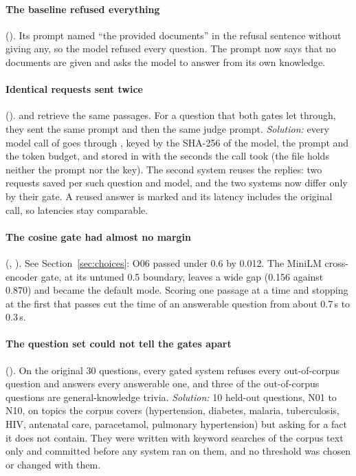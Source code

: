 \paragraph{The  baseline refused everything} ().
Its prompt named ``the provided documents'' in the refusal sentence without giving any, so the model
refused every question. The prompt now says that no documents are given and asks the model to
answer from its own knowledge.

\paragraph{Identical requests sent twice} ().
 and  retrieve the same passages. For a question that both gates
let through, they sent the same prompt and then the same judge prompt. \emph{Solution:} every model
call of  goes through , keyed by the SHA-256 of the model, the prompt and
the token budget, and stored in  with the seconds the call took (the
file holds neither the prompt nor the key). The second system reuses the replies: two requests saved
per such question and model, and the two systems now differ only by their gate. A reused answer is
marked  and its latency includes the original call, so latencies stay comparable.

\paragraph{The cosine gate had almost no margin} (, ).
See Section~\ref{sec:choices}: O06 passed under 0.6 by 0.012. The MiniLM cross-encoder gate, at its
untuned 0.5 boundary, leaves a wide gap (0.156 against 0.870) and became the default mode. Scoring
one passage at a time and stopping at the first that passes cut the time of an answerable question
from about 0.7\,s to 0.3\,s.

\paragraph{The question set could not tell the gates apart} ().
On the original 30 questions, every gated system refuses every out-of-corpus question and answers
every answerable one, and three of the out-of-corpus questions are general-knowledge trivia.
\emph{Solution:} 10 held-out questions, N01 to N10, on topics the corpus covers (hypertension,
diabetes, malaria, tuberculosis, HIV, antenatal care, paracetamol, pulmonary hypertension) but asking
for a fact it does not contain. They were written with keyword searches of the corpus text only and
committed before any system ran on them, and no threshold was chosen or changed with them.

